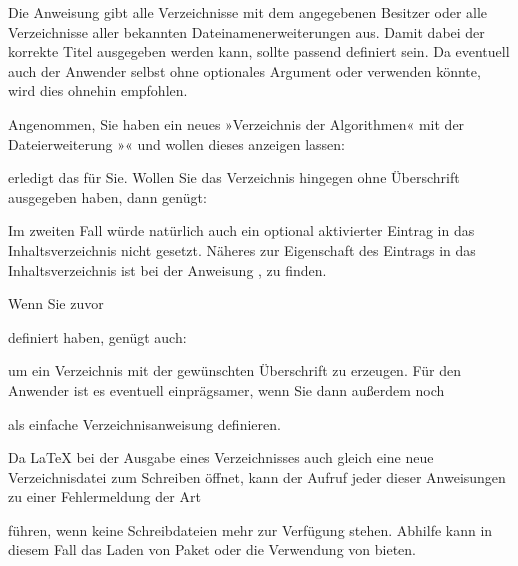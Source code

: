 Die Anweisung  gibt alle
Verzeichnisse mit dem angegebenen Besitzer oder alle Verzeichnisse aller
bekannten Dateinamenerweiterungen aus. Damit dabei der
korrekte Titel ausgegeben werden kann, sollte
 passend definiert sein.
Da eventuell auch der Anwender selbst  ohne
optionales Argument oder  verwenden könnte, wird dies
ohnehin empfohlen.
\begin{Example}
  Angenommen, Sie haben ein neues »Verzeichnis der Algorithmen« mit der
  Dateierweiterung »« und wollen dieses anzeigen lassen:
\begin{lstcode}
\end{lstcode}
  erledigt das für Sie. Wollen Sie das Verzeichnis hingegen ohne Überschrift
  ausgegeben haben, dann genügt:
\begin{lstcode}
\end{lstcode}
  Im zweiten Fall würde natürlich auch ein optional aktivierter Eintrag in das
  Inhaltsverzeichnis nicht gesetzt. Näheres zur Eigenschaft des Eintrags in
  das Inhaltsverzeichnis ist bei der Anweisung
  ,  zu
  finden.

  Wenn Sie zuvor
\begin{lstcode}
  \newcommand*{\listofloaname}{%
    Verzeichnis der Algorithmen%
  }
\end{lstcode}
  definiert haben, genügt auch:
\begin{lstcode}
\end{lstcode}
  um ein Verzeichnis mit der gewünschten Überschrift zu erzeugen. Für den
  Anwender ist es eventuell einprägsamer, wenn Sie dann außerdem noch
\begin{lstcode}
  \newcommand*{\listofalgorithms}{\listoftoc{loa}}
\end{lstcode}
  als einfache Verzeichnisanweisung definieren.
\end{Example}

Da \LaTeX{} bei der Ausgabe eines Verzeichnisses auch
gleich eine neue Verzeichnisdatei zum Schreiben öffnet, kann der Aufruf jeder
dieser Anweisungen zu einer Fehlermeldung der Art
führen, wenn keine Schreibdateien mehr zur Verfügung stehen. Abhilfe kann in
diesem Fall das Laden von Paket
\cite{package:scrwfile} oder die Verwendung von \LuaLaTeX{} bieten.

